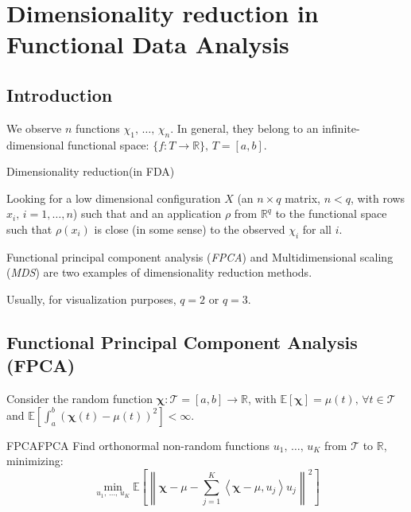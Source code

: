 \chapter{Dimensionality reduction in Functional Data Analysis}

\section{Introduction}
We observe $n$ functions $\chi_1,\, \dots,\, \chi_n$. In general,
they belong to an infinite-dimensional functional space:
$\{f: T \to \mathds R\},\,T = [a, b]$.
\begin{problem}{Dimensionality reduction}{}(in FDA)

Looking for a low dimensional configuration $X$
(an $n \times q$ matrix, $n < q$, with rows $x_i,\,i=1,\dots,n$) such that
and an application $\rho$ from $\mathds R^q$ to the functional space such
that $\rho(x_i)$ is close (in some sense) to the observed $\chi_i$ for all $i$.

\tcblower

Functional principal component analysis (\emph{FPCA}) and
Multidimensional scaling (\emph{MDS}) are two examples of dimensionality reduction methods.


\begin{note}
	Usually, for visualization purposes, $q=2$ or $q=3$.
\end{note}
\end{problem}

\pagebreak
\section[Functional PCA]{Functional Principal Component Analysis (FPCA)}

Consider the random function $\boldsymbol \chi : \mathcal T = [a, b] \to \mathds R$,
with $\mathds E [\boldsymbol \chi] = \mu(t),\, \forall t \in \mathcal T$ and
$\mathds E \left[ \int_a^b \left( \boldsymbol \chi(t) - \mu(t) \right)^2 \right] < \infty$.

\begin{problem}{FPCA}{FPCA}
Find orthonormal non-random functions $u_1,\, \dots,\, u_K$ from $\mathcal T$ to $\mathds R$,
minimizing:
\begin{equation*}
	\min_{u_1,\, \dots,\, u_K} \mathds E \left[
		\left\lVert
		\boldsymbol \chi - \mu - \sum_{j=1}^K \left\langle
		\boldsymbol \chi - \mu, u_j
		\right\rangle u_j
		\right\rVert^2
		\right]
\end{equation*}
\end{problem}

